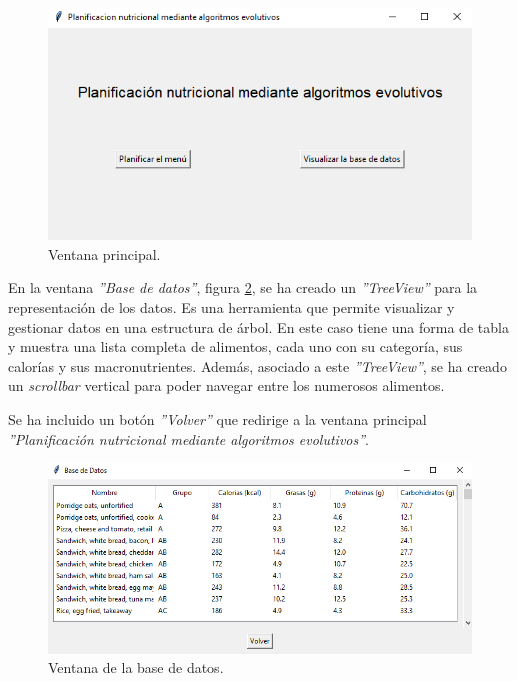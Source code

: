 \begin{figure}[H]
    \centering
    \includegraphics[width=1\textwidth]{figures/ventana-main.png}
    \caption{Ventana principal.}
    \label{fig:ventana-main}
\end{figure}
\newpage
En la ventana \textit{''Base de datos''}, figura \ref{fig:ventana-basedatos}, se ha creado un \textit{''TreeView''} para la representación de los datos. Es una herramienta que permite visualizar y gestionar datos en una estructura de árbol. En este caso tiene una forma de tabla y muestra una lista completa de alimentos, cada uno con su categoría, sus calorías y sus macronutrientes. Además, asociado a este \textit{''TreeView''}, se ha creado un \textit{scrollbar} vertical para poder navegar entre los numerosos alimentos.

Se ha incluido un botón \textit{''Volver''} que redirige a la ventana principal \textit{''Planificación nutricional mediante algoritmos evolutivos''}.

\begin{figure}[H]
    \centering
    \includegraphics[width=1\textwidth]{figures/ventana-basedatos.png}
    \caption{Ventana de la base de datos.}
    \label{fig:ventana-basedatos}
\end{figure}

